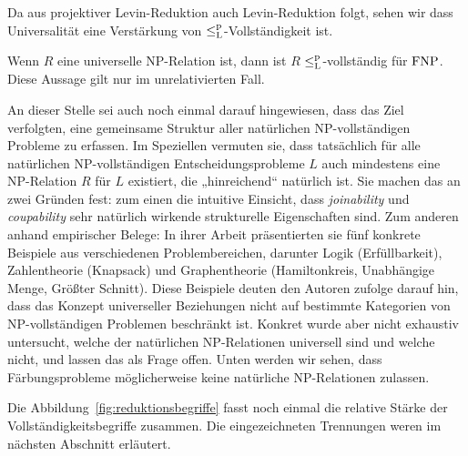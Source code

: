 Da aus projektiver Levin-Reduktion auch Levin-Reduktion folgt, sehen wir dass Universalität eine Verstärkung von $\leq_\mathrm{L}^\mathrm{p}$-Vollständigkeit ist.
\begin{corollary}
    Wenn $R$ eine universelle NP-Relation ist, dann ist $R$ $\leq_\mathrm{L}^\mathrm{p}$-vollständig für $\mathrm{FNP}$.
    Diese Aussage gilt nur im unrelativierten Fall.
\end{corollary}

An dieser Stelle sei auch noch einmal darauf hingewiesen, dass \textcite{agrawal_universal_1992} das Ziel verfolgten, eine gemeinsame Struktur aller natürlichen NP-vollständigen Probleme zu erfassen. Im Speziellen vermuten sie, dass tatsächlich für alle natürlichen NP-vollständigen Entscheidungsprobleme $L$ auch mindestens eine NP-Relation $R$ für $L$ existiert, die „hinreichend“ natürlich ist. Sie machen das an zwei Gründen fest: zum einen die intuitive Einsicht, dass \emph{joinability} und \emph{coupability} sehr natürlich wirkende strukturelle Eigenschaften sind. Zum anderen anhand empirischer Belege: 
 In ihrer Arbeit präsentierten sie fünf konkrete Beispiele aus verschiedenen Problembereichen, darunter Logik (Erfüllbarkeit), Zahlentheorie (Knapsack) und Graphentheorie (Hamiltonkreis, Unabhängige Menge, Größter Schnitt). Diese Beispiele deuten den Autoren zufolge darauf hin, dass das Konzept universeller Beziehungen nicht auf bestimmte Kategorien von NP-vollständigen Problemen beschränkt ist. 
 Konkret wurde aber nicht exhaustiv untersucht, welche der natürlichen NP-Relationen universell sind und welche nicht, und \textcite{agrawal_universal_1992} lassen das als Frage offen. Unten werden wir sehen, dass Färbungsprobleme möglicherweise keine natürliche NP-Relationen zulassen. %

Die Abbildung~\ref{fig:reduktionsbegriffe} fasst noch einmal die relative Stärke der Vollständigkeitsbegriffe zusammen. Die eingezeichneten Trennungen weren im nächsten Abschnitt erläutert.

